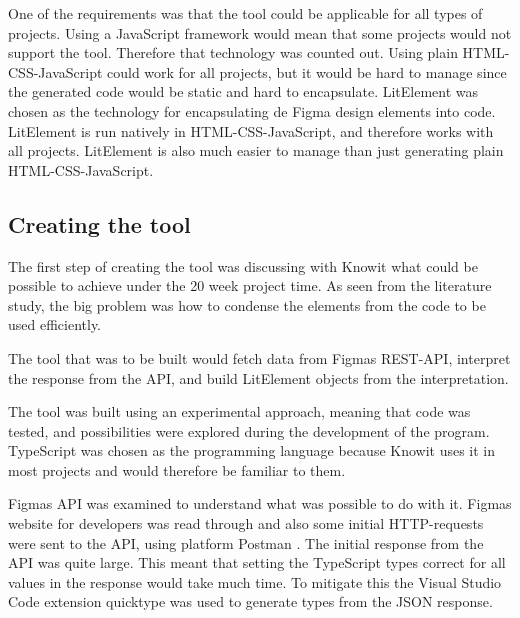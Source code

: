 One of the requirements was that the tool could be applicable for all types of projects. Using a JavaScript framework would mean that some projects would not support the tool. Therefore that technology was counted out. Using plain HTML-CSS-JavaScript could work for all projects, but it would be hard to manage since the generated code would be static and hard to encapsulate. LitElement was chosen as the technology for encapsulating de Figma design elements into code. LitElement is run natively in HTML-CSS-JavaScript, and therefore works with all projects. LitElement is also much easier to manage than just generating plain HTML-CSS-JavaScript.





\subsection{Creating the tool}%
\label{sub:}


The first step of creating the tool was discussing with Knowit what could be possible to achieve under the 20 week project time. As seen from the literature study, the big problem was how to condense the elements from the code to be used efficiently. 

The tool that was to be built would fetch data from Figmas REST-API, interpret the response from the API, and build LitElement objects from the interpretation.

The tool was built using an experimental approach, meaning that code was tested, and possibilities were explored during the development of the program. TypeScript was chosen as the programming language because Knowit uses it in most projects and would therefore be familiar to them.

Figmas API was examined to understand what was possible to do with it. Figmas website for developers\cite{figmaFigma} was read through and also some initial HTTP-requests were sent to the API, using platform Postman \cite{PostmanCollaborationPlatform}. The initial response from the API was quite large. This meant that setting the TypeScript types correct for all values in the response would take much time. To mitigate this the Visual Studio Code \cite{VisualStudioCode} extension quicktype\cite{ConvertJSONSwift} was used to generate types from the JSON response. 

